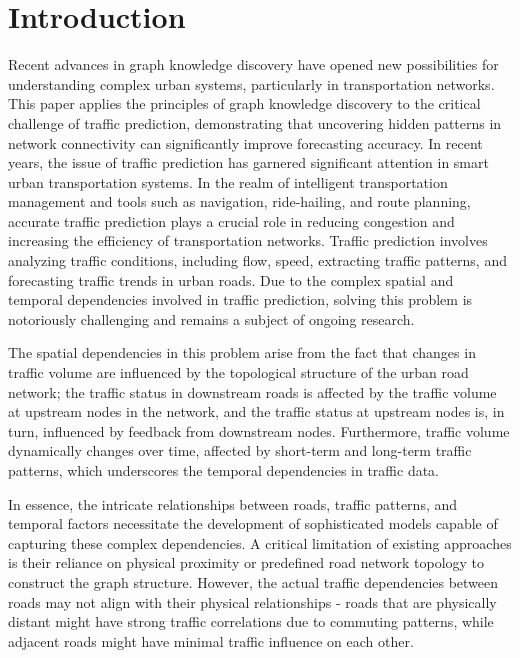 \documentclass[pdflatex,sn-mathphys-num]{sn-jnl}%
\theoremstyle{thmstyleone}%
\theoremstyle{thmstyletwo}%
\theoremstyle{thmstylethree}%
\begin{document}
\maketitle



\section{Introduction}
Recent advances in graph knowledge discovery have opened new possibilities for understanding complex urban systems, particularly in transportation networks. This paper applies the principles of graph knowledge discovery to the critical challenge of traffic prediction, demonstrating that uncovering hidden patterns in network connectivity can significantly improve forecasting accuracy.
In recent years, the issue of traffic prediction has garnered significant attention in smart urban transportation systems. In the realm of intelligent transportation management and tools such as navigation, ride-hailing, and route planning, accurate traffic prediction plays a crucial role in reducing congestion and increasing the efficiency of transportation networks. Traffic prediction involves analyzing traffic conditions, including flow, speed, extracting traffic patterns, and forecasting traffic trends in urban roads. Due to the complex spatial and temporal dependencies involved in traffic prediction, solving this problem is notoriously challenging and remains a subject of ongoing research.

The spatial dependencies in this problem arise from the fact that changes in traffic volume are influenced by the topological structure of the urban road network; the traffic status in downstream roads is affected by the traffic volume at upstream nodes in the network, and the traffic status at upstream nodes is, in turn, influenced by feedback from downstream nodes. Furthermore, traffic volume dynamically changes over time, affected by short-term and long-term traffic patterns, which underscores the temporal dependencies in traffic data.

In essence, the intricate relationships between roads, traffic patterns, and temporal factors necessitate the development of sophisticated models capable of capturing these complex dependencies. A critical limitation of existing approaches is their reliance on physical proximity or predefined road network topology to construct the graph structure. However, the actual traffic dependencies between roads may not align with their physical relationships - roads that are physically distant might have strong traffic correlations due to commuting patterns, while adjacent roads might have minimal traffic influence on each other.
\end{document}

